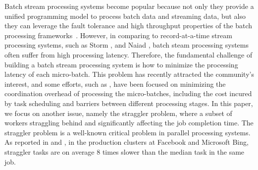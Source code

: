 Batch stream processing systems become popular because not only they provide a
unified programming model to process batch data and streaming data, but also
they can leverage the fault tolerance and high throughput properties of the
batch processing frameworks~\cite{spark-summit}. However, in comparing to
record-at-a-time stream processing systems, such as Storm \cite{storm-web}, and
Naiad \cite{Murray2013}, batch steam processing systems often suffer from high
processing latency. Therefore, the fundamental challenge of building a batch
stream processing system is how to minimize the processing latency of each
micro-batch.
This problem has recently attracted the community's interest, and some efforts, such
as \cite{drizzle}, have been focused on minimizing the coordination overhead of
processing the micro-batches, including the cost incured by task scheduling and
barriers between different processing stages. 
In this paper, we focus on another issue, namely the straggler problem, where a
subset of workers straggling behind and significantly affecting the job
completion time. The straggler problem is a well-known critical problem in
parallel processing systems. As reported in
\cite{Ananthanarayanan2013} and \cite{Yadwadkar2014}, in the production clusters at
Facebook and Microsoft Bing, straggler tasks are on average 8 times slower than
the median task in the same job. 

